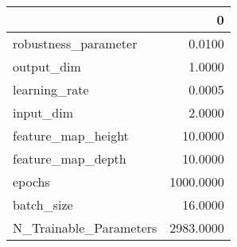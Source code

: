 \begin{tabular}{lr}
\toprule
{} &          0 \\
\midrule
robustness\_parameter   &     0.0100 \\
output\_dim             &     1.0000 \\
learning\_rate          &     0.0005 \\
input\_dim              &     2.0000 \\
feature\_map\_height     &    10.0000 \\
feature\_map\_depth      &    10.0000 \\
epochs                 &  1000.0000 \\
batch\_size             &    16.0000 \\
N\_Trainable\_Parameters &  2983.0000 \\
\bottomrule
\end{tabular}
